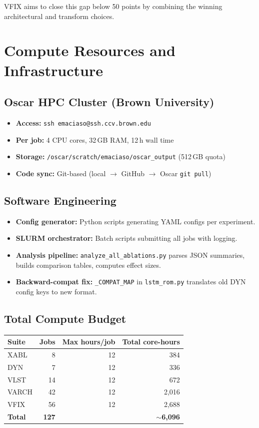 \documentclass[11pt]{article}
\begin{document}
VFIX aims to close this gap below 50 points by combining the winning
architectural and transform choices.


\section{Compute Resources and Infrastructure}
\label{sec:compute}

\subsection{Oscar HPC Cluster (Brown University)}
\begin{itemize}[nosep]
  \item \textbf{Access:} \texttt{ssh emaciaso@ssh.ccv.brown.edu}
  \item \textbf{Per job:} 4 CPU cores, 32\,GB RAM, 12\,h wall time
  \item \textbf{Storage:} \texttt{/oscar/scratch/emaciaso/oscar\_output} (512\,GB quota)
  \item \textbf{Code sync:} Git-based (local $\to$ GitHub $\to$ Oscar \texttt{git pull})
\end{itemize}

\subsection{Software Engineering}
\begin{itemize}[nosep]
  \item \textbf{Config generator:} Python scripts generating YAML configs per experiment.
  \item \textbf{SLURM orchestrator:} Batch scripts submitting all jobs with logging.
  \item \textbf{Analysis pipeline:} \texttt{analyze\_all\_ablations.py} parses JSON summaries,
    builds comparison tables, computes effect sizes.
  \item \textbf{Backward-compat fix:} \texttt{\_COMPAT\_MAP} in \texttt{lstm\_rom.py}
    translates old DYN config keys to new format.
\end{itemize}

\subsection{Total Compute Budget}

\begin{center}
\begin{tabular}{lrrr}
\toprule
Suite & Jobs & Max hours/job & Total core-hours \\
\midrule
XABL & 8 & 12 & 384 \\
DYN & 7 & 12 & 336 \\
VLST & 14 & 12 & 672 \\
VARCH & 42 & 12 & 2,016 \\
VFIX & 56 & 12 & 2,688 \\
\midrule
\textbf{Total} & \textbf{127} & & \textbf{$\sim$6,096} \\
\bottomrule
\end{tabular}
\end{center}
\end{document}
